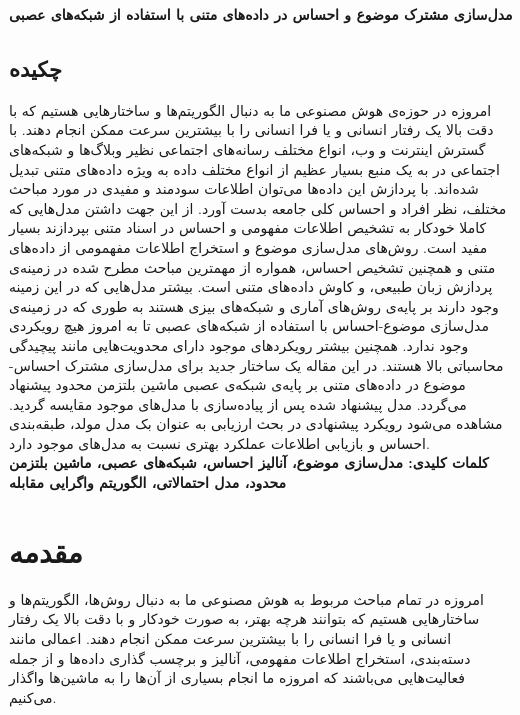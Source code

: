 \documentclass[12pt,a4paper]{article}
\begin{document}
\begin{center}
	{\Large \textbf{مدل‌سازی مشترک موضوع و احساس در داده‌های متنی با استفاده از شبکه‌های عصبی}}\\
\end{center}

	
\subsection*{چکیده}
\begin{small}
	\baselineskip=0.7cm
	امروزه در حوزه‌ی هوش مصنوعی ما به دنبال الگوریتم‌ها و ساختارهایی هستیم که با دقت بالا یک  رفتار انسانی‌ و یا فرا انسانی‌ را با بیشترین سرعت ممکن انجام دهند. با گسترش اینترنت و وب، انواع مختلف رسانه‌های اجتماعی نظیر وبلاگ‌ها و شبکه‌های اجتماعی در به یک منبع بسیار عظیم از انواع مختلف داده به ویژه داده‌‌های  متنی تبدیل شده‌اند. با پردازش این داده‌ها می‌‌توان اطلاعات سودمند و مفیدی در مورد مباحث مختلف، نظر افراد و احساس کلی‌ جامعه بدست آورد. از این جهت داشتن مدل‌هایی که کاملا خودکار به تشخیص اطلاعات مفهومی‌ و احساس در اسناد متنی بپردازند بسیار مفید است. روش‌های مدل‌سازی موضوع و استخراج اطلاعات مفهمومی از داده‌های متنی و همچنین تشخیص احساس، همواره از مهمترین مباحث مطرح شده در زمینه‌ی پردازش زبان طبیعی، و کاوش داده‌های متنی است. بیشتر مدل‌هایی که در این زمینه وجود دارند بر پایه‌ی روش‌های آماری و شبکه‌های بیزی هستند به طوری که در زمینه‌ی مدل‌سازی موضوع-احساس با استفاده از شبکه‌های عصبی تا به امروز هیچ رویکردی وجود ندارد. همچنین بیشتر رویکردهای موجود دارای محدویت‌هایی مانند پیچیدگی محاسباتی بالا هستند. در این مقاله یک ساختار جدید برای مدل‌سازی مشترک احساس-موضوع در داده‌های متنی بر پایه‌ی شبکه‌‌ی عصبی ماشین بلتزمن محدود پیشنهاد می‌‌گردد. مدل پیشنهاد شده پس از پیاده‌سازی با مدل‌های موجود مقایسه گردید. مشاهده می‌شود رویکرد پیشنهادی در بحث ارزیابی به عنوان بک مدل مولد، طبقه‌بندی احساس و بازیابی اطلاعات عملکرد بهتری نسبت به مدل‌های موجود دارد.\\
	\noindent\textbf{کلمات کلیدی: مدل‌سازی موضوع، آنالیز احساس، شبکه‌ها‌ی عصبی، ماشین بلتزمن محدود، مدل احتمالاتی، الگوریتم واگرایی مقابله}
\end{small} 


\section{مقدمه}
\label{sec1}

امروزه در تمام مباحث مربوط به هوش مصنوعی ما به دنبال روش‌ها، الگوریتم‌ها و ساختارهایی هستیم که بتوانند هرچه بهتر، 
به صورت خودکار و با دقت بالا یک  رفتار انسانی‌ و یا فرا انسانی‌ را با بیشترین سرعت ممکن انجام دهند. اعمالی مانند دسته‌بندی، استخراج اطلاعات مفهومی، آنالیز و برچسب گذاری داده‌ها و از جمله فعالیت‌هایی‌ می‌‌باشند که امروزه ما انجام بسیاری از آن‌ها را به ماشین‌ها واگذار می‌‌کنیم. 
\end{document}
